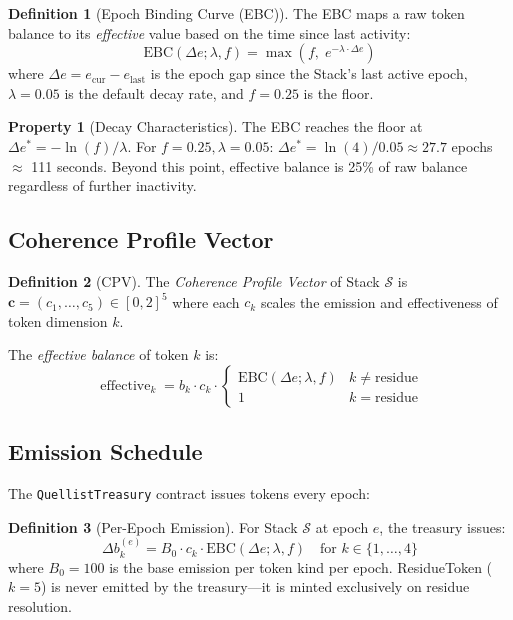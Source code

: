 \documentclass[11pt,twocolumn]{article}
\theoremstyle{definition}
\newtheorem{definition}{Definition}[section]
\newtheorem{property}{Property}[section]
\theoremstyle{plain}
\theoremstyle{remark}
\DeclareMathOperator{\effectivebal}{effective}
\begin{document}
\begin{definition}[Epoch Binding Curve (EBC)]\label{def:ebc}
The EBC maps a raw token balance to its \emph{effective} value based on the time since last activity:
\begin{equation}\label{eq:ebc}
  \mathrm{EBC}(\Delta e; \lambda, f) = \max\!\left(f,\; e^{-\lambda \cdot \Delta e}\right)
\end{equation}
where $\Delta e = e_{\mathrm{cur}} - e_{\mathrm{last}}$ is the epoch gap since the Stack's last active epoch, $\lambda = 0.05$ is the default decay rate, and $f = 0.25$ is the floor.
\end{definition}

\begin{property}[Decay Characteristics]
The EBC reaches the floor at $\Delta e^* = -\ln(f) / \lambda$. For $f = 0.25, \lambda = 0.05$: $\Delta e^* = \ln(4) / 0.05 \approx 27.7$ epochs $\approx$ 111 seconds. Beyond this point, effective balance is 25\% of raw balance regardless of further inactivity.
\end{property}

\subsection{Coherence Profile Vector}

\begin{definition}[CPV]\label{def:cpv}
The \emph{Coherence Profile Vector} of Stack $\mathcal{S}$ is $\mathbf{c} = (c_1, \ldots, c_5) \in [0, 2]^5$ where each $c_k$ scales the emission and effectiveness of token dimension $k$.
\end{definition}

The \emph{effective balance} of token $k$ is:
\begin{equation}\label{eq:effective}
  \effectivebal_k = b_k \cdot c_k \cdot \begin{cases}
    \mathrm{EBC}(\Delta e; \lambda, f) & k \neq \mathrm{residue}\\
    1 & k = \mathrm{residue}
  \end{cases}
\end{equation}

\subsection{Emission Schedule}

The \texttt{QuellistTreasury} contract issues tokens every epoch:

\begin{definition}[Per-Epoch Emission]\label{def:emission}
For Stack $\mathcal{S}$ at epoch $e$, the treasury issues:
\begin{equation}\label{eq:emission}
  \Delta b_k^{(e)} = B_0 \cdot c_k \cdot \mathrm{EBC}(\Delta e; \lambda, f) \quad \text{for } k \in \{1,\ldots,4\}
\end{equation}
where $B_0 = 100$ is the base emission per token kind per epoch. ResidueToken ($k=5$) is never emitted by the treasury---it is minted exclusively on residue resolution.
\end{definition}
\end{document}
